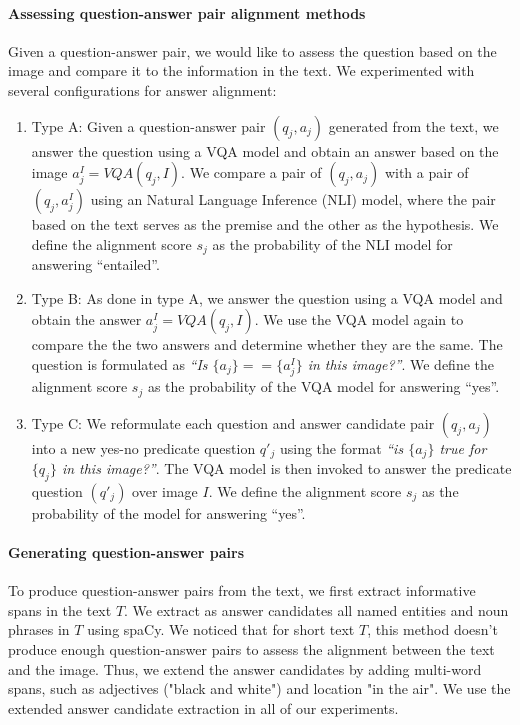 \documentclass{article}
\begin{document}
\paragraph{Assessing question-answer pair alignment methods} Given a question-answer pair, we would like to assess the question based on the image and compare it to the information in the text.
We experimented with several configurations for answer alignment:

\begin{enumerate}
    \item Type A: Given a question-answer pair $(q_j, a_j)$ generated from the text, we answer the question using a VQA model and obtain an answer based on the image $a^I_j = VQA(q_j, I)$.
    We compare a pair of $(q_j, a_j)$ with a pair of $(q_j, a^I_j)$ using an Natural Language Inference (NLI) model, where the pair based on the text serves as the premise and the other as the hypothesis. We define the alignment score $s_j$ as the probability of the NLI model for answering ``entailed''.
    \item Type B: As done in type A, we answer the question using a VQA model and obtain the answer $a^I_j = VQA(q_j, I)$.
    We use the VQA model again to compare the the two answers and determine whether they are the same. The question is formulated as \textit{``Is $\{a_j\} == \{a^I_j\}$ in this image?''}. We define the alignment score $s_j$ as the probability of the VQA model for answering ``yes''.
    \item Type C: We reformulate each question and answer candidate pair $(q_j, a_j)$ into a new yes-no predicate question $q'_j$ using the format \textit{``is $\{a_j\}$ true for $\{q_j\}$ in this image?''}. The VQA model is then invoked to answer the predicate question $(q'_j)$ over image $I$. We define the alignment score $s_j$ as the probability of the model for answering ``yes''.
\end{enumerate}

\paragraph{Generating question-answer pairs} To produce question-answer pairs from the text, we first extract informative spans in the text $T$. 
We extract as answer candidates all named entities and noun phrases in $T$ using spaCy.
We noticed that for short text $T$, this method doesn't produce enough question-answer pairs to assess the alignment between the text and the image. Thus, we extend the answer candidates by adding multi-word spans, such as adjectives ("black and white") and location "in the air". We use the extended answer candidate extraction in all of our experiments.
\end{document}
